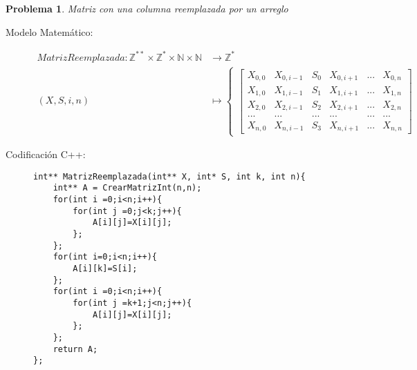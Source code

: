 \documentclass{article}
\theoremstyle{plain}
\theoremstyle{definition}
\newtheorem{problem}{Problema}
\begin{document}
\begin{problem} \emph{Matriz con una columna reemplazada por un arreglo }\\
\begin{description}
\item[Modelo Matemático:]
\begin{align*}
MatrizReemplazada: \mathbb{Z}^{**}\times\mathbb{Z}^{*}\times\mathbb{N}\times\mathbb{N} &\to \mathbb{Z}^{*}\\
(X,S,i,n) &\mapsto
\begin{cases}
\begin{bmatrix}
X_{0,0} & X_{0,i-1} & S_{0} & X_{0,i+1} & ...& X_{0,n} \\
X_{1,0} & X_{1,i-1} & S_{1} & X_{1,i+1} & ...& X_{1,n} \\
X_{2,0} & X_{2,i-1} & S_{2} & X_{2,i+1} & ... & X_{2,n} \\
... & ... & ... & ...& ... & ...\\
X_{n,0} & X_{n,i-1} & S_{3} & X_{n,i+1} & ... & X_{n,n}
\end{bmatrix}
\end{cases}
\end{align*}
%
\item[Codificación \textsf{C++}:]\hfill
%
\begin{verbatim}
int** MatrizReemplazada(int** X, int* S, int k, int n){
    int** A = CrearMatrizInt(n,n);
    for(int i =0;i<n;i++){
        for(int j =0;j<k;j++){
            A[i][j]=X[i][j];
        };
    };
    for(int i=0;i<n;i++){
        A[i][k]=S[i];
    };
    for(int i =0;i<n;i++){
        for(int j =k+1;j<n;j++){
            A[i][j]=X[i][j];
        };
    };
    return A;
};
\end{verbatim}
\end{description}
\end{problem}
\end{document}
